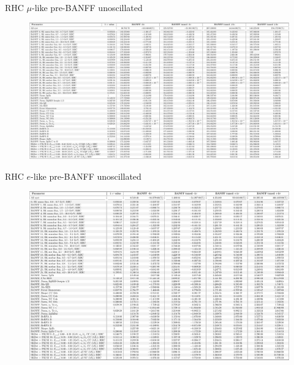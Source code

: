 \documentclass{beamer}
\newcommand{\backupend}{
   \setcounter{framenumber}{\value{finalframe}}
}
\begin{document}
\begin{frame}{RHC $\mu$-like pre-BANFF unoscillated}
	\centering
	\begin{figure}
		\includegraphics[page=1, trim={0cm 0cm 0cm 0cm}, clip, scale=0.25] {images/variations/tables/systematic_tables_prefit_unosc_RHC1Rmu}
	\end{figure}
\end{frame}

\begin{frame}{RHC $e$-like pre-BANFF unoscillated}
	\centering
	\begin{figure}
		\includegraphics[page=1, trim={0cm 0cm 0cm 0cm}, clip, scale=0.3] {images/variations/tables/systematic_tables_prefit_unosc_RHC1Re}
	\end{figure}
\end{frame}

\backupend
\end{document}
